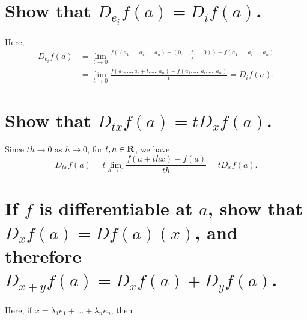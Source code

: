 
\begin{parts}
    \part{
        Show that $D_{e_i}f(a)=D_if(a)$.
    }
    \begin{solution}
        Here,
        \begin{align*}
        D_{e_i}f(a)&=\lim_{t\to 0}{
        \frac{f((a_1,...,a_i,...,a_n)+
        (0,...,t,...,0))-
        f(a_1,...,a_i,...,a_n)}{t}
        }\\
        &=\lim_{t\to 0}{
        \frac{f(a_1,...,a_i+t,...,a_n)-
        f(a_1,...,a_i,...,a_n)}{t}
        }=D_if(a).
        \end{align*}
    \end{solution}
    \part{
        Show that $D_{tx}f(a)=tD_xf(a)$.
    }
    \begin{solution}
        Since $th\to 0$ as $h\to 0$,
        for $t,h\in \mathbf{R}$, we have
        $$D_{tx}f(a)=t\lim_{h\to 0}
        {\frac{f(a+thx)-f(a)}{th}}
        =tD_xf(a).$$
    \end{solution}

    \part{
        If $f$ is differentiable at $a$,
        show that $D_xf(a)=Df(a)(x)$, and
        therefore $D_{x+y}f(a)=D_xf(a)+
        D_yf(a)$.
    }
    \begin{solution}
        Here, if $x=\lambda_1e_1+
        ...+\lambda_ne_n$, then
    \end{solution}
\end{parts}